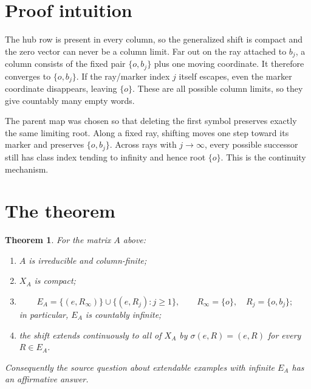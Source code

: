 \documentclass[11pt]{article}
\newtheorem{theorem}{Theorem}
\newcommand{\EA}{E_A}
\newcommand{\XA}{X_A}
\begin{document}
\section{Proof intuition}

The hub row is present in every column, so the generalized shift is compact
and the zero vector can never be a column limit.  Far out on the ray attached
to $b_j$, a column consists of the fixed pair $\{o,b_j\}$ plus one moving
coordinate.  It therefore converges to $\{o,b_j\}$.  If the ray/marker index
$j$ itself escapes, even the marker coordinate disappears, leaving $\{o\}$.
These are all possible column limits, so they give countably many empty words.

The parent map was chosen so that deleting the first symbol preserves exactly
the same limiting root.  Along a fixed ray, shifting moves one step toward its
marker and preserves $\{o,b_j\}$.  Across rays with $j\to\infty$, every possible
successor still has class index tending to infinity and hence root $\{o\}$.
This is the continuity mechanism.

\section{The theorem}

\begin{theorem}\label{thm:main}
For the matrix $A$ above:
\begin{enumerate}[label=(\alph*)]
\item $A$ is irreducible and column-finite;
\item $\XA$ is compact;
\item
\[
 \EA=\{(e,R_\infty)\}\cup\{(e,R_j):j\geq1\},
 \qquad R_\infty=\{o\},\quad R_j=\{o,b_j\};
\]
in particular, $\EA$ is countably infinite;
\item the shift extends continuously to all of $\XA$ by
$\sigma(e,R)=(e,R)$ for every $R\in\EA$.
\end{enumerate}
Consequently the source question about extendable examples with infinite
$\EA$ has an affirmative answer.
\end{theorem}
\end{document}
